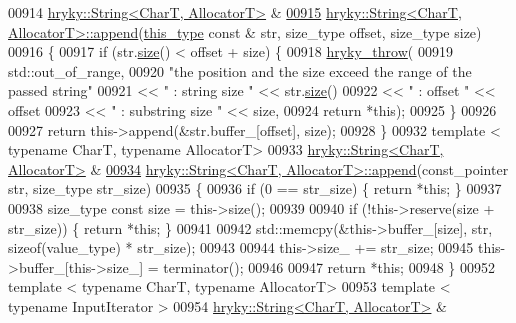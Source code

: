 \begin{DoxyCode}
00914 \hyperlink{classhryky_1_1_string}{hryky::String<CharT, AllocatorT>} &
\hypertarget{string_8h_source_l00915}{}\hyperlink{classhryky_1_1_string_a79e1ddcf05952e24719cab2213f5a9a2}{00915} \hyperlink{classhryky_1_1_string}{hryky::String<CharT, AllocatorT>::append}(\hyperlink{classhryky_1_1_string}{this_type} \textcolor{keyword}{const} & str, size\_type 
      offset, size\_type size)
00916 \{
00917     \textcolor{keywordflow}{if} (str.\hyperlink{classhryky_1_1_string_a9db0f71dce7b2de86a54ab5323759265}{size}() < offset + size) \{
00918         \hyperlink{debug__common_8h_af50606eac4009921527ddcaed392b2c2}{hryky_throw}(
00919             std::out\_of\_range,
00920             \textcolor{stringliteral}{"the position and the size exceed the range of the passed string"}
00921             << \textcolor{stringliteral}{" : string size "} << str.\hyperlink{classhryky_1_1_string_a9db0f71dce7b2de86a54ab5323759265}{size}()
00922             << \textcolor{stringliteral}{" : offset "} << offset
00923             << \textcolor{stringliteral}{" : substring size "} << size,
00924             \textcolor{keywordflow}{return} *\textcolor{keyword}{this});
00925     \}
00926 
00927     \textcolor{keywordflow}{return} this->append(&str.buffer\_[offset], size);
00928 \}
00932 \textcolor{keyword}{template} < \textcolor{keyword}{typename} CharT, \textcolor{keyword}{typename} AllocatorT>
00933 \hyperlink{classhryky_1_1_string}{hryky::String<CharT, AllocatorT>} &
\hypertarget{string_8h_source_l00934}{}\hyperlink{classhryky_1_1_string_a615f5e44a0d32341b0e94147a3a1c8a9}{00934} \hyperlink{classhryky_1_1_string}{hryky::String<CharT, AllocatorT>::append}(const\_pointer str, size\_type str\_size)
00935 \{
00936     \textcolor{keywordflow}{if} (0 == str\_size) \{ \textcolor{keywordflow}{return} *\textcolor{keyword}{this}; \}
00937 
00938     size\_type \textcolor{keyword}{const} size = this->size();
00939 
00940     \textcolor{keywordflow}{if} (!this->reserve(size + str\_size)) \{ \textcolor{keywordflow}{return} *\textcolor{keyword}{this}; \}
00941 
00942     std::memcpy(&this->buffer\_[size], str, \textcolor{keyword}{sizeof}(value\_type) * str\_size);
00943 
00944     this->size\_ += str\_size;
00945     this->buffer\_[this->size\_] = terminator();
00946 
00947     \textcolor{keywordflow}{return} *\textcolor{keyword}{this};
00948 \}
00952 \textcolor{keyword}{template} < \textcolor{keyword}{typename} CharT, \textcolor{keyword}{typename} AllocatorT>
00953 \textcolor{keyword}{template} < \textcolor{keyword}{typename} InputIterator >
00954 \hyperlink{classhryky_1_1_string}{hryky::String<CharT, AllocatorT>} &

\end{DoxyCode}
